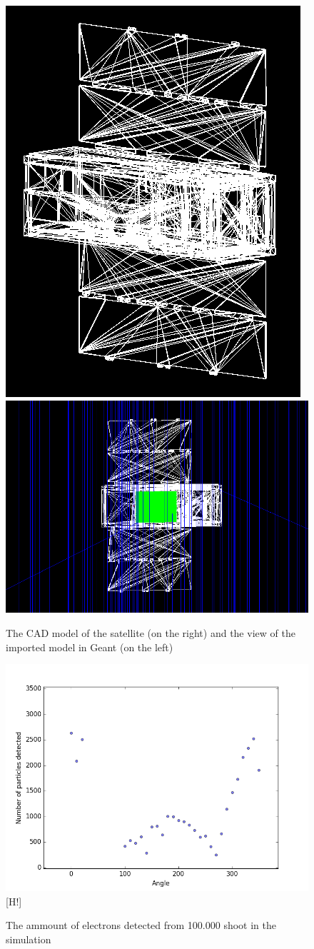 \documentclass[12pt, a4paper,titlepage]{article}
\numberwithin{equation}{section}
\numberwithin{figure}{section}
\begin{document}
\begin{figure}[h!]
 \centering %
 \includegraphics[width=.3\textwidth,origin=c,angle=0]{images/satellite.png}
 \qquad
 \includegraphics[width=.5\textwidth,origin=c,angle=90]{images/8mac.png} 
 \caption{\label{fig:i} The CAD model of the satellite (on the right) and the view of the imported model in Geant (on the left)}
 \end{figure}

\begin{figure}[h!]
\includegraphics[width=150.0mm]{images/electronabsorption.png}[H!]
\caption{The ammount of electrons detected from 100.000 shoot in the simulation}
\end{figure}
\end{document}
